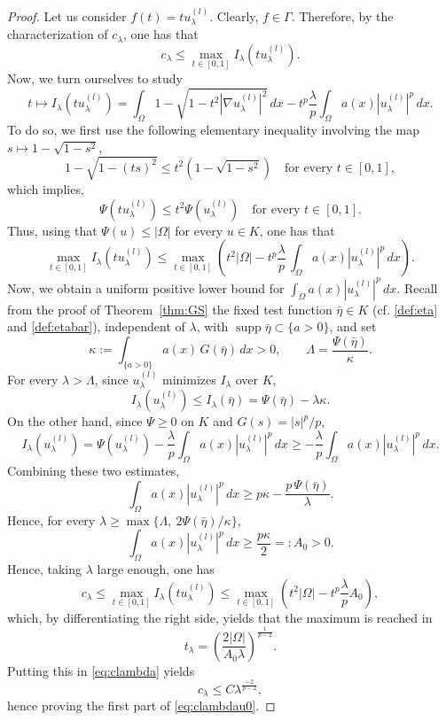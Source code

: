 \documentclass[11pt,reqno]{amsart}
\theoremstyle{plain}
\theoremstyle{definition}
\numberwithin{equation}{section}
\begin{document}
\begin{proof}
    Let us consider $f(t) = t u_\lambda^{(l)}$. Clearly, $f \in \Gamma $. Therefore, by the characterization of $c_\lambda$, one has that
    $$c_\lambda \leq \max_{t \in [0,1]} I_\lambda(t u_\lambda^{(l)}).$$
    Now, we turn ourselves to study
    $$t\mapsto I_\lambda(tu_\lambda^{(l)}) = \int_\Omega 1 - \sqrt{1-t^2 |\nabla u_\lambda^{(l)}|^2} \, dx - t^p  \frac{\lambda}{p} \int_\Omega a(x) |u_\lambda^{(l)}|^p \, dx.$$
    To do so, we first use the following elementary inequality involving the map $s\mapsto 1-\sqrt{1-s^2} $,
    $$1-\sqrt{1-(ts)^2} \leq t^2 (1 -\sqrt{1-s^2}) \quad \text{for every } t\in [0,1],$$
    which implies, 
    $$\Psi(t u_\lambda^{(l)}) \leq t^2 \Psi(u_\lambda^{(l)}) \quad \text{for every } t\in [0,1].$$
    Thus, using that $\Psi(u) \leq |\Omega|$ for every $u \in K$, one has that
    $$\max_{t \in [0,1]} I_\lambda(t u_\lambda^{(l)}) \leq \max_{t \in [0,1]} \left( t^2 |\Omega | - t^p \frac{\lambda}{p}  \, \int_\Omega a(x) |u_\lambda^{(l)}|^p \, dx \right).$$
    Now, we obtain a uniform positive lower bound for $\int_\Omega a(x)|u_\lambda^{(l)}|^p\,dx$. Recall from the proof of Theorem~\ref{thm:GS} the fixed test function $\bar \eta \in K$ (cf. \eqref{def:eta} and \eqref{def:etabar}), independent of $\lambda$, with $\operatorname{supp} \bar \eta \subset \{a>0\}$, and set
$$\kappa := \int_{\{a>0\}} a(x)\, G(\bar \eta) \, dx > 0, \qquad \Lambda = \frac{\Psi(\bar \eta)}{\kappa}.$$
For every $\lambda > \Lambda$, since $u_\lambda^{(l)}$ minimizes $I_\lambda$ over $K$,
$$I_\lambda(u_\lambda^{(l)}) \leq I_\lambda(\bar\eta) = \Psi(\bar\eta) - \lambda \kappa.$$
On the other hand, since $\Psi \geq 0$ on $K$ and $G(s) = |s|^p/p$,
$$I_\lambda(u_\lambda^{(l)}) = \Psi(u_\lambda^{(l)}) - \frac{\lambda}{p} \int_\Omega a(x) |u_\lambda^{(l)}|^p \, dx \geq -\frac{\lambda}{p} \int_\Omega a(x) |u_\lambda^{(l)}|^p \, dx.$$
Combining these two estimates,
$$\int_\Omega a(x) |u_\lambda^{(l)}|^p \, dx \geq p\kappa - \frac{p\,\Psi(\bar \eta)}{\lambda}.$$
Hence, for every $\lambda \geq  \max\{\Lambda,\ 2\Psi(\bar\eta)/\kappa\}$,
$$\int_\Omega a(x) |u_\lambda^{(l)}|^p \, dx \geq \frac{p\kappa}{2} =: A_0 > 0.$$Hence, taking $\lambda$ large enough, one has 
    \begin{equation} \label{eq:clambda}
    c_\lambda \leq \max_{t \in [0,1]} I_\lambda(t u_\lambda^{(l)}) \leq \max_{t \in [0,1]} \left( t^2 |\Omega | - t^p\frac{\lambda}{p}  A_0 \right),\end{equation}
    which, by differentiating the right side, yields that the maximum is reached in
    $$t_\lambda = \left(\frac{2 |\Omega|}{A_0 \lambda}\right)^{\frac{1}{p-2}}. $$
    Putting this in \eqref{eq:clambda} yields
    $$c_\lambda \leq C \lambda^{\frac{-2}{p-2}},$$
    hence proving the first part of \eqref{eq:clambdau0}.


\end{proof}
\end{document}
